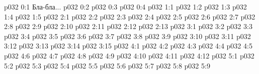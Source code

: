\author{Могущественный Посланник}
\vs p032 0:1  Бла-бла...
\vs p032 0:2 
\vs p032 0:3 
\vs p032 0:4 
\vs p032 1:1 
\vs p032 1:2 
\vs p032 1:3 \pc 
\vs p032 1:4 
\vs p032 1:5 \pc 
{}
\vs p032 2:1 
\vs p032 2:2 
\vs p032 2:3 \pc 
\vs p032 2:4 
\vs p032 2:5 
\vs p032 2:6 \pc 
\vs p032 2:7 
\vs p032 2:8 
\vs p032 2:9 \pc 
\vs p032 2:10 
\vs p032 2:11 
\vs p032 2:12 
\vs p032 2:13 \pc 
{}
\vs p032 3:1 
\vs p032 3:2 
\vs p032 3:3 
\vs p032 3:4 \pc 
\vs p032 3:5 
\vs p032 3:6 
\vs p032 3:7 \pc 
\vs p032 3:8 \pc 
\vs p032 3:9 
\vs p032 3:10 
\vs p032 3:11 
\vs p032 3:12 
\vs p032 3:13 
\vs p032 3:14 
\vs p032 3:15 
\vs p032 4:1 
\vs p032 4:2 
\vs p032 4:3 \pc 
\vs p032 4:4 
\vs p032 4:5 \pc 
\vs p032 4:6 \pc 
\vs p032 4:7 
\vs p032 4:8 
\vs p032 4:9 \pc 
\vs p032 4:10 \pc 
\vs p032 4:11 
\vs p032 4:12 
\vs p032 5:1 
\vs p032 5:2 
\vs p032 5:3 \pc 
\vs p032 5:4 
\vs p032 5:5 
\vs p032 5:6 
\vs p032 5:7 \pc 
\vs p032 5:8 
\vsetoff
\vs p032 5:9 
\quizlink
